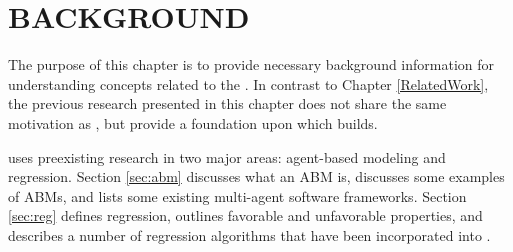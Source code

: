 \chapter{BACKGROUND}
\thispagestyle{plain}

\label{Background}

The purpose of this chapter is to provide necessary background information for understanding concepts related to the \framework.
In contrast to Chapter \ref{RelatedWork}, the previous research presented in this chapter does not share the same motivation as \fw, but provide a foundation upon which \fw builds.

\fw uses preexisting research in two major areas:
agent-based modeling and regression.
Section \ref{sec:abm} discusses what an ABM is, discusses some examples of ABMs, and lists some existing multi-agent software frameworks.
Section \ref{sec:reg} defines regression, outlines favorable and unfavorable properties, and describes a number of regression algorithms that have been incorporated into \fw.


